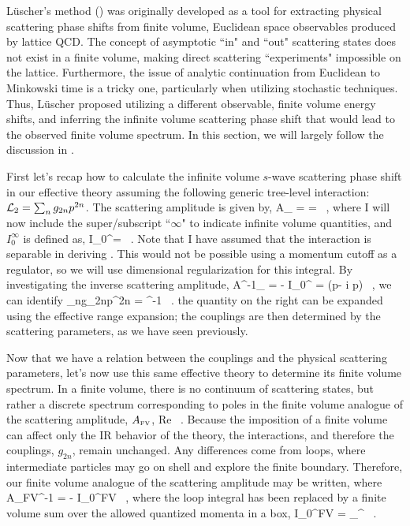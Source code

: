 L\"uscher's method (\cite{Luscher:1986pf,Luscher:1990ux}) was originally developed as a tool for extracting physical scattering phase shifts from finite volume, Euclidean space observables produced by lattice QCD. The concept of asymptotic ``in" and ``out" scattering states does not exist in a finite volume, making direct scattering ``experiments" impossible on the lattice. Furthermore, the issue of analytic continuation from Euclidean to Minkowski time is a tricky one, particularly when utilizing stochastic techniques. Thus, L\"uscher proposed utilizing a different observable, finite volume energy shifts, and inferring the infinite volume scattering phase shift that would lead to the observed finite volume spectrum. In this section, we will largely follow the discussion in \cite{Beane:2003da}.

First let's recap how to calculate the infinite volume $s$-wave scattering phase shift in our effective theory assuming the following generic tree-level interaction: ${\mathcal{ L}}_2 = \sum_n g_{2n}p^{2n}$. The scattering amplitude is given by,
\beq
\label{eq:Aluscher}
A_{\infty} =  =  \ ,
\eeq
where I will now include the super/subscript ``$\infty$" to indicate infinite volume quantities, and $I_0^{\infty}$ is defined as,
\beq
I_0^{\infty}=\int {}  \ .
\eeq
Note that I have assumed that the interaction is separable in deriving . This would not be possible using a momentum cutoff as a regulator, so we will use dimensional regularization for this integral. By investigating the inverse scattering amplitude,
\beq
A^{-1}_{\infty} =  - I_0^{\infty} = (p\cot\delta - i p) \ ,
\eeq 
we can identify
\beq
\label{eq:C2n}
\sum_ng_{2n}p^{2n} = ^{-1} \ .
\eeq
the quantity on the right can be expanded using the effective range expansion; the couplings are then determined by the scattering parameters, as we have seen previously.

Now that we have a relation between the couplings and the physical scattering parameters, let's now use this same effective theory to determine its finite volume spectrum. In a finite volume, there is no continuum of scattering states, but rather a discrete spectrum corresponding to poles in the finite volume analogue of the scattering amplitude, $A_{\mbox{\tiny FV}}$,
\beq
\label{eq:luschereig}
\mbox{Re} \ .
\eeq
Because the imposition of a finite volume can affect only the IR behavior of the theory, the interactions, and therefore the couplings, $g_{2n}$, remain unchanged. Any differences come from loops, where intermediate particles may go on shell and explore the finite boundary. Therefore, our finite volume analogue of the scattering amplitude may be written,
where
\beq
A_{\mbox{\tiny FV}}^{-1} =  - I_0^{\mbox{\tiny FV}} \ ,
\eeq
where the loop integral has been replaced by a finite volume sum over the allowed quantized momenta in a box,
\beq
I_0^{\mbox{\tiny FV}} =  \sum_{}^{\Lambda}  \ .
\eeq

